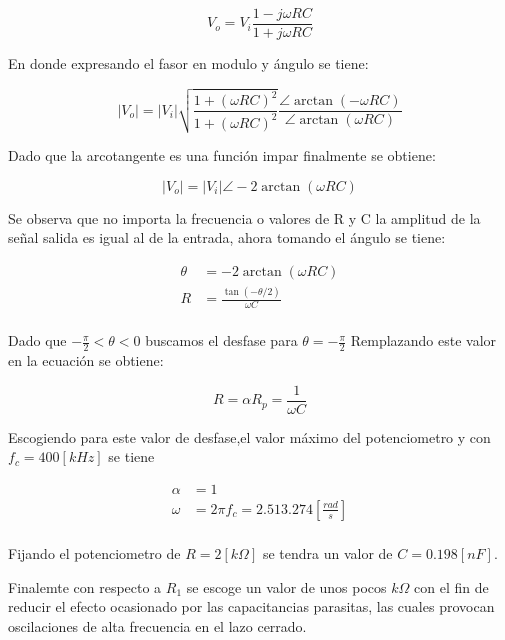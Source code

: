 \documentclass[letterpaper, titlepage]{article}
\providecommand{\abs}[1]{\lvert#1\rvert}
\begin{document}
\begin{enumerate}
\begin{equation}
V_{o} = V_{i} \frac{1- j \omega R C}{1 + j \omega R C}
\end{equation}
		
En donde expresando el fasor en modulo y ángulo se tiene:

\begin{equation*}
\abs{V_{o}}  = \abs{V_{i}} \sqrt{\frac{1 +( \omega R C)^2}{1 +( \omega R C)^2}} \frac{\angle \arctan(- \omega R C ) }{\angle \arctan(\omega R C )}
\end{equation*}

\newpage

Dado que la arcotangente es una función impar finalmente se obtiene:

\begin{equation}
\abs{V_{o}}  = \abs{V_{i}} \angle -2 \arctan (\omega R C)
\end{equation}
		
Se observa que no importa la frecuencia o valores de R y C la amplitud de la señal salida es igual al de la entrada, ahora tomando el ángulo se tiene:	

\begin{align*}
\theta & = -2 \arctan (\omega R C) \\
R & = \frac{\tan( -\theta/2)}{ \omega C }\\
\end{align*}

Dado que $- \frac{\pi}{2}< \theta < 0$ 	buscamos el desfase para $\theta =- \frac{\pi}{2}$ Remplazando este valor en la ecuación se obtiene:

\begin{equation}
R = \alpha R_{p} = \frac{1}{\omega C}
\end{equation}

Escogiendo para este valor de desfase,el valor máximo del potenciometro y con $f_{c}= 400[kHz]$ se tiene

\begin{align*}
\alpha & = 1 \\
\omega & = 2 \pi f_{c} = 2.513.274 [\frac{rad}{s}] \\
\end{align*}

Fijando el potenciometro de $ R=2[k \Omega ] $ se tendra un valor de $ C = 0.198[nF] $.

Finalemte con respecto a $ R_{1} $ se escoge un valor de unos pocos $ k \Omega $ con el fin de reducir el efecto ocasionado por las capacitancias parasitas, las cuales provocan oscilaciones de alta frecuencia en el lazo cerrado. 


\end{enumerate}
\end{document}
